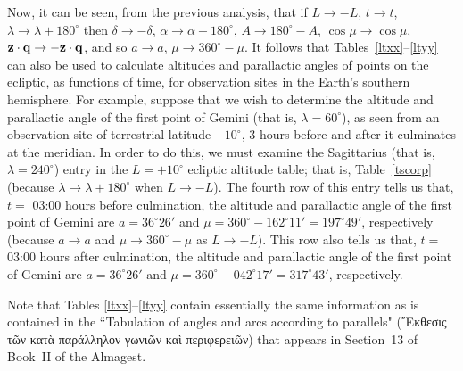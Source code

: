 Now, it can be seen, from the previous analysis, that if $L\rightarrow -L$, $t\rightarrow t$, $\lambda\rightarrow \lambda+180^\circ$ then $\delta\rightarrow -\delta$, $\alpha \rightarrow \alpha+180^\circ$,  $A\rightarrow180^\circ-A$,  $\cos\mu\rightarrow \cos\mu$, ${\bf z}\cdot{\bf q} \rightarrow -{\bf z}\cdot{\bf q}$, and so $a\rightarrow a$, $\mu\rightarrow 360^\circ-\mu$. 
It follows that Tables~\ref{ltxx}--\ref{ltyy} can also be used to calculate altitudes and parallactic angles of  points on the
ecliptic, as functions of
time, for  observation sites in the Earth's southern hemisphere. For example, suppose that we wish to
determine the altitude and parallactic angle of the first point of Gemini (that is, $\lambda=60^\circ$), as seen from an observation site of terrestrial latitude $-10^\circ$,  3 hours before and after it
culminates at the meridian. 
In order to do this, we must examine the Sagittarius  (that is, $\lambda=240^\circ$) entry in the $L=+10^\circ$ ecliptic altitude table; that is, Table~\ref{tscorp} (because $\lambda\rightarrow \lambda+180^\circ$
when $L\rightarrow -L$). The fourth row of this entry tells us that, $t=$\,\,03:00 hours before culmination, the altitude and
parallactic angle of the first point of Gemini are $a=36^\circ 26'$ and
$\mu=360^\circ -162^\circ 11'=197^\circ 49'$, respectively (because $a\rightarrow a$ and $\mu\rightarrow 360^\circ-\mu$ as
$L\rightarrow-L$).
This row also tells us that, $t=$\,\,03:00 hours after culmination, the altitude and
parallactic angle of the first point of Gemini are $a=36^\circ 26'$ and
$\mu=360^\circ -042^\circ 17'=317^\circ 43'$, respectively. 

Note that Tables \ref{ltxx}--\ref{ltyy} contain essentially the same information as is contained in the ``Tabulation of angles and arcs according to parallels"
(῎Εκθεσις τῶν κατὰ παράλληλον γωνιῶν καὶ περιφερειῶν) that appears in Section~13 of Book~II of the Almagest. 

\clearpage
